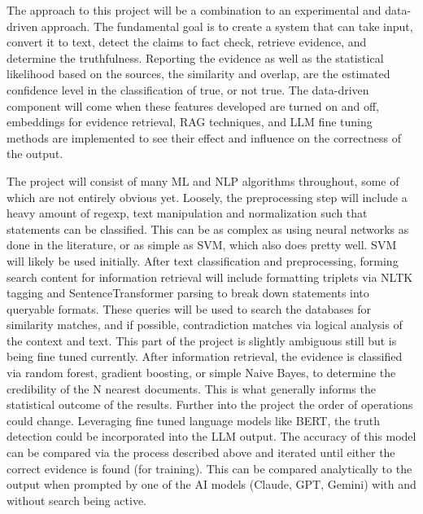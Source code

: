 \documentclass[11pt,letterpaper]{article}
\newcommand{\methodology}[5]{
    \section*{Methodology}
    \addcontentsline{toc}{section}{Methodology}
    \subsection*{Overview}
    #1
    \subsection*{Models and Algorithms}
    #2
    \subsection*{Tech Stack}
    #3
    \subsection*{Implementation Strategy}
    #4
    \subsection*{Evaluation Metrics}
    #5
}
\begin{document}
\methodology
{

The approach to this project will be a combination to an experimental and data-driven approach. The fundamental goal is to create a system that can take input, convert it to text, detect the claims to fact check, retrieve evidence, and determine the truthfulness. Reporting the evidence as well as the statistical likelihood based on the sources, the similarity and overlap, are the estimated confidence level in the classification of true, or not true. The data-driven component will come when these features developed are turned on and off, embeddings for evidence retrieval, RAG techniques, and LLM fine tuning methods are implemented to see their effect and influence on the correctness of the output.

}
{

The project will consist of many ML and NLP algorithms throughout, some of which are not entirely obvious yet. Loosely, the preprocessing step will include a heavy amount of regexp, text manipulation and normalization such that statements can be classified. This can be as complex as using neural networks as done in the literature, or as simple as SVM, which also does pretty well. SVM will likely be used initially. After text classification and preprocessing, forming search content for information retrieval will include formatting triplets via NLTK tagging and SentenceTransformer parsing to break down statements into queryable formats. These queries will be used to search the databases for similarity matches, and if possible, contradiction matches via logical analysis of the context and text. This part of the project is slightly ambiguous still but is being fine tuned currently. After information retrieval, the evidence is classified via random forest, gradient boosting, or simple Naive Bayes, to determine the credibility of the N nearest documents. This is what generally informs the statistical outcome of the results. Further into the project the order of operations could change. Leveraging fine tuned language models like BERT, the truth detection could be incorporated into the LLM output. The accuracy of this model can be compared via the process described above and iterated until either the correct evidence is found (for training). This can be compared analytically to the output when prompted by one of the AI models (Claude, GPT, Gemini) with and without search being active.

}
\end{document}
